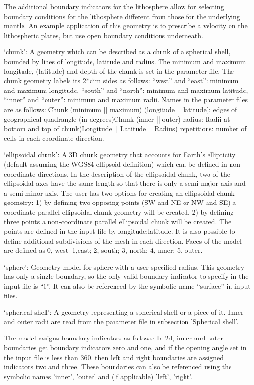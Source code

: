 \begin{itemize}
The additional boundary indicators for the lithosphere allow for selecting boundary conditions for the lithosphere different from those for the underlying mantle. An example application of this geometry is to prescribe a velocity on the lithospheric plates, but use open boundary conditions underneath. 

`chunk': A geometry which can be described as a chunk of a spherical shell, bounded by lines of longitude, latitude and radius. The minimum and maximum longitude, (latitude) and depth of the chunk is set in the parameter file. The chunk geometry labels its 2*dim sides as follows: ``west'' and ``east'': minimum and maximum longitude, ``south'' and ``north'': minimum and maximum latitude, ``inner'' and ``outer'': minimum and maximum radii. Names in the parameter files are as follows: Chunk (minimum || maximum) (longitude || latitude): edges of geographical quadrangle (in degrees)Chunk (inner || outer) radius: Radii at bottom and top of chunk(Longitude || Latitude || Radius) repetitions: number of cells in each coordinate direction.

`ellipsoidal chunk': A 3D chunk geometry that accounts for Earth's ellipticity (default assuming the WGS84 ellipsoid definition) which can be defined in non-coordinate directions. In the description of the ellipsoidal chunk, two of the ellipsoidal axes have the same length so that there is only a semi-major axis and a semi-minor axis. The user has two options for creating an ellipsoidal chunk geometry: 1) by defining two opposing points (SW and NE or NW and SE) a coordinate parallel ellipsoidal chunk geometry will be created. 2) by defining three points a non-coordinate parallel ellipsoidal chunk will be created. The points are defined in the input file by longitude:latitude. It is also possible to define additional subdivisions of the mesh in each direction. Faces of the model are defined as 0, west; 1,east; 2, south; 3, north; 4, inner; 5, outer. 

`sphere': Geometry model for sphere with a user specified radius. This geometry has only a single boundary, so the only valid boundary indicator to specify in the input file is ``0''. It can also be referenced by the symbolic name ``surface'' in input files.

`spherical shell': A geometry representing a spherical shell or a piece of it. Inner and outer radii are read from the parameter file in subsection 'Spherical shell'.

The model assigns boundary indicators as follows: In 2d, inner and outer boundaries get boundary indicators zero and one, and if the opening angle set in the input file is less than 360, then left and right boundaries are assigned indicators two and three. These boundaries can also be referenced using the symbolic names 'inner', 'outer' and (if applicable) 'left', 'right'.


\end{itemize}
